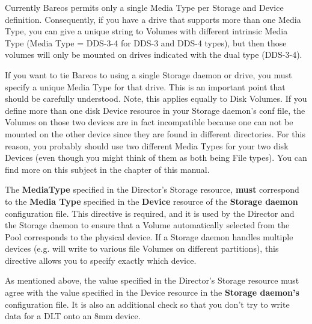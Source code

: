 \begin{description}
Currently Bareos permits only a single Media Type per Storage
and Device definition. Consequently, if
you have a drive that supports more than one Media Type, you can
give a unique string to Volumes with different intrinsic Media
Type (Media Type = DDS-3-4 for DDS-3 and DDS-4 types), but then
those volumes will only be mounted on drives indicated with the
dual type (DDS-3-4).

If you want to tie Bareos to using a single Storage daemon or drive, you
must specify a unique Media Type for that drive.  This is an important
point that should be carefully understood.  Note, this applies equally
to Disk Volumes.  If you define more than one disk Device resource in
your Storage daemon's conf file, the Volumes on those two devices are in
fact incompatible because one can not be mounted on the other device
since they are found in different directories.  For this reason, you
probably should use two different Media Types for your two disk Devices
(even though you might think of them as both being File types).  You can
find more on this subject in the  chapter of this manual.

The {\bf MediaType} specified in the Director's Storage resource, {\bf
must} correspond to the {\bf Media Type} specified in the {\bf Device}
resource of the {\bf Storage daemon} configuration file.  This directive
is required, and it is used by the Director and the Storage daemon to
ensure that a Volume automatically selected from the Pool corresponds to
the physical device.  If a Storage daemon handles multiple devices (e.g.
will write to various file Volumes on different partitions), this
directive allows you to specify exactly which device.

As mentioned above, the value specified in the Director's Storage
resource must agree with the value specified in the Device resource in
the {\bf Storage daemon's} configuration file.  It is also an additional
check so that you don't try to write data for a DLT onto an 8mm device.


\end{description}
